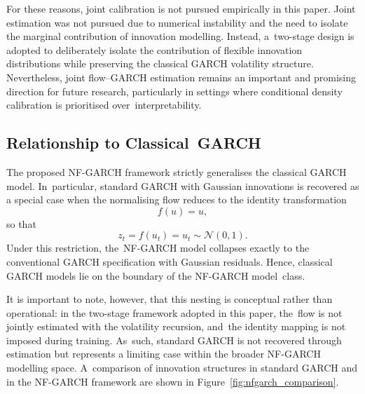 \documentclass[risks,article,accept,pdftex,moreauthors]{Definitions/mdpi}
\begin{document}
For these reasons, joint calibration is not pursued empirically in this paper. Joint estimation was not pursued due to numerical instability and the need to isolate the marginal contribution of innovation modelling. Instead, a~two-stage design is adopted to deliberately isolate the contribution of flexible innovation distributions while preserving the classical GARCH volatility structure. Nevertheless, joint flow--GARCH estimation remains an important and promising direction for future research, particularly in settings where conditional density calibration is prioritised over~interpretability.

\subsection{Relationship to Classical~GARCH}
The proposed NF-GARCH framework strictly generalises the classical GARCH model. In~particular, standard GARCH with Gaussian innovations is recovered as a special case when the normalising flow reduces to the identity transformation
\[
f(u) = u,
\]
so that
\[
z_t = f(u_t) = u_t \sim \mathcal{N}(0,1).
\]
Under this restriction, the~NF-GARCH model collapses exactly to the conventional GARCH specification with Gaussian residuals. Hence, classical GARCH models lie on the boundary of the NF-GARCH model~class.

It is important to note, however, that this nesting is conceptual rather than operational: in the two-stage framework adopted in this paper, the~flow is not jointly estimated with the volatility recursion, and~the identity mapping is not imposed during training. As~such, standard GARCH is not recovered through estimation but represents a limiting case within the broader NF-GARCH modelling space. A~comparison of innovation structures in standard GARCH and in the NF-GARCH framework are shown in Figure~\ref{fig:nfgarch_comparison}.
\end{document}
